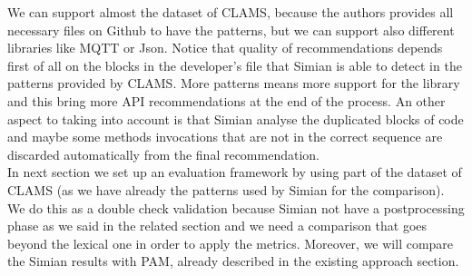 We can support almost the dataset of CLAMS, because the authors provides all necessary files on Github to have the patterns, but we can support also different libraries like MQTT or Json. Notice that quality of recommendations depends first of all on the blocks in the developer's file that Simian is able to detect in the patterns provided by CLAMS. More patterns means more support for the library and this bring more API recommendations at the end of the process. An other aspect to taking into account is that Simian analyse the duplicated blocks of code and maybe some methods invocations that are not in the correct sequence are discarded automatically from the final recommendation. \\
In next section we set up an evaluation framework  by using part of the dataset of CLAMS (as we have already the patterns used by Simian for the comparison). We do this as a double check validation because Simian not have a postprocessing phase as we said in the related section and we need a comparison that goes beyond the lexical one in order to apply the metrics. Moreover, we will compare the Simian results with PAM, already described in the existing approach section.




